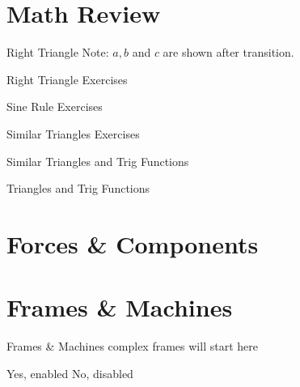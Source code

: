 \documentclass[9pt,xcolor={svgnames, x11names}]{beamer}
\begin{document}
\section{Math Review}

\begin{frame}{Right Triangle}
  Note: $a, b$ and $c$ are shown after transition.
  \vspace{1cm}
  
\end{frame}

\begin{frame}{Right Triangle Exercises}
  \resizebox{0.75\textwidth}{!}{%
  
}
\end{frame}

\begin{frame}{Sine Rule Exercises}
  
\end{frame}

\begin{frame}{Similar Triangles Exercises}
  
\end{frame}

\begin{frame}{Similar Triangles and Trig Functions}
  
\end{frame}

\begin{frame}{Triangles and Trig Functions}
  
\end{frame}

\section{Forces \& Components}


\section{Frames \& Machines}

\begin{frame}{Frames \& Machines}
  complex frames will start here

  \ifnum{}
 Yes, enabled
\else
 No, disabled
\fi
\end{frame}
\end{document}
